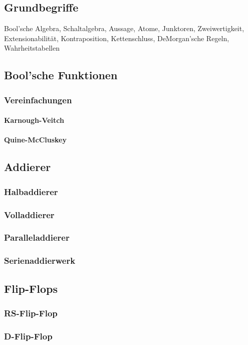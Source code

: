\documentclass{article}
\begin{document}
\subsection{Grundbegriffe}
Bool'sche Algebra, Schaltalgebra, Aussage, Atome, Junktoren, Zweiwertigkeit, Extensionabilität, Kontraposition, Kettenschluss, DeMorgan'sche Regeln, Wahrheitstabellen
\subsection{Bool'sche Funktionen}
\subsubsection{Vereinfachungen}
\paragraph{Karnough-Veitch}
\paragraph{Quine-McCluskey}
\subsection{Addierer}
\subsubsection{Halbaddierer}
\subsubsection{Volladdierer}
\subsubsection{Paralleladdierer}
\subsubsection{Serienaddierwerk}
\subsection{Flip-Flops}
\subsubsection{RS-Flip-Flop}
\subsubsection{D-Flip-Flop}
\end{document}
